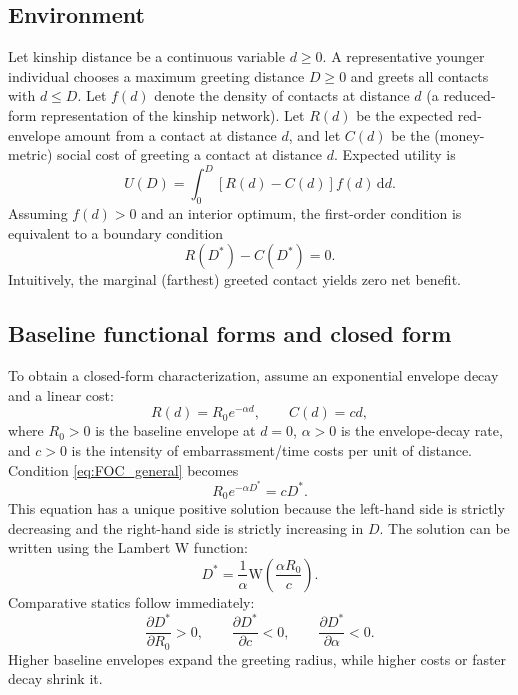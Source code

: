 \documentclass[AER]{AEA}
\newcommand{\LambertW}{\mathrm{W}}
\begin{document}
\subsection{Environment}
Let kinship distance be a continuous variable $d\ge 0$. A representative younger individual chooses a maximum greeting distance $D\ge 0$ and greets all contacts with $d\le D$. Let $f(d)$ denote the density of contacts at distance $d$ (a reduced-form representation of the kinship network). Let $R(d)$ be the expected red-envelope amount from a contact at distance $d$, and let $C(d)$ be the (money-metric) social cost of greeting a contact at distance $d$. Expected utility is
\begin{equation}
U(D)=\int_{0}^{D}\left[R(d)-C(d)\right]f(d)\,\mathrm{d}d.
\end{equation}
Assuming $f(d)>0$ and an interior optimum, the first-order condition is equivalent to a boundary condition
\begin{equation}
R(D^*)-C(D^*)=0.
\label{eq:FOC_general}
\end{equation}
Intuitively, the marginal (farthest) greeted contact yields zero net benefit.

\subsection{Baseline functional forms and closed form}
To obtain a closed-form characterization, assume an exponential envelope decay and a linear cost:
\begin{equation}
R(d)=R_0 e^{-\alpha d},\qquad C(d)=cd,
\end{equation}
where $R_0>0$ is the baseline envelope at $d=0$, $\alpha>0$ is the envelope-decay rate, and $c>0$ is the intensity of embarrassment/time costs per unit of distance. Condition \eqref{eq:FOC_general} becomes
\begin{equation}
R_0 e^{-\alpha D^*}=cD^*.
\label{eq:FOC_exp_linear}
\end{equation}
This equation has a unique positive solution because the left-hand side is strictly decreasing and the right-hand side is strictly increasing in $D$. The solution can be written using the Lambert W function:
\begin{equation}
D^*=\frac{1}{\alpha}\LambertW\!\left(\frac{\alpha R_0}{c}\right).
\end{equation}
Comparative statics follow immediately:
\begin{equation}
\frac{\partial D^*}{\partial R_0}>0,\qquad
\frac{\partial D^*}{\partial c}<0,\qquad
\frac{\partial D^*}{\partial \alpha}<0.
\end{equation}
Higher baseline envelopes expand the greeting radius, while higher costs or faster decay shrink it.
\end{document}
